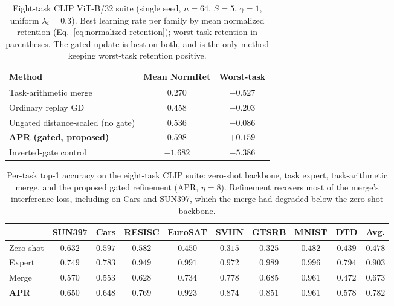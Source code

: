 \documentclass[11pt]{article}
\begin{document}
\begin{table}[t]
\centering
\caption{Eight-task CLIP ViT-B/32 suite (single seed, $n=64$, $S=5$, $\gamma=1$, uniform $\lambda_i=0.3$). Best learning rate per family by mean normalized retention (Eq.~\eqref{eq:normalized-retention}); worst-task retention in parentheses. The gated update is best on both, and is the only method keeping worst-task retention positive.}
\label{tab:clip8}
\begin{tabular}{lcc}
\toprule
Method & Mean NormRet & Worst-task \\
\midrule
Task-arithmetic merge & $0.270$ & $-0.527$ \\
Ordinary replay GD & $0.458$ & $-0.203$ \\
Ungated distance-scaled (no gate) & $0.536$ & $-0.086$ \\
\textbf{APR (gated, proposed)} & $\mathbf{0.598}$ & $\mathbf{+0.159}$ \\
\midrule
Inverted-gate control & $-1.682$ & $-5.386$ \\
\bottomrule
\end{tabular}
\end{table}

\begin{table}[t]
\centering
\footnotesize
\setlength{\tabcolsep}{4pt}
\caption{Per-task top-1 accuracy on the eight-task CLIP suite: zero-shot backbone, task expert, task-arithmetic merge, and the proposed gated refinement (APR, $\eta=8$). Refinement recovers most of the merge's interference loss, including on Cars and SUN397, which the merge had degraded below the zero-shot backbone.}
\label{tab:clip8pt}
\begin{tabular}{lccccccccc}
\toprule
 & SUN397 & Cars & RESISC & EuroSAT & SVHN & GTSRB & MNIST & DTD & Avg. \\
\midrule
Zero-shot & $0.632$ & $0.597$ & $0.582$ & $0.450$ & $0.315$ & $0.325$ & $0.482$ & $0.439$ & $0.478$ \\
Expert    & $0.749$ & $0.783$ & $0.949$ & $0.991$ & $0.972$ & $0.989$ & $0.996$ & $0.794$ & $0.903$ \\
Merge     & $0.570$ & $0.553$ & $0.628$ & $0.734$ & $0.778$ & $0.685$ & $0.961$ & $0.472$ & $0.673$ \\
\textbf{APR} & $\mathbf{0.650}$ & $\mathbf{0.648}$ & $\mathbf{0.769}$ & $\mathbf{0.923}$ & $\mathbf{0.874}$ & $\mathbf{0.851}$ & $0.961$ & $\mathbf{0.578}$ & $\mathbf{0.782}$ \\
\bottomrule
\end{tabular}
\end{table}
\end{document}
